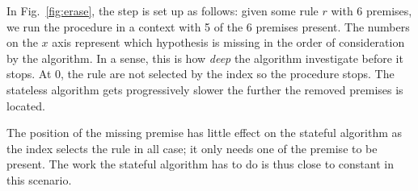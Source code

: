 \documentclass[runningheads]{llncs}
\newcommand{\xcom}[1]{{\color{cyan}{Xavier: #1}} }
\begin{document}
In Fig.~\ref{fig:erase}, the step is set up as follows: given some rule $r$ with $6$ \xcom{motivate 6} premises, we run the procedure in a context with 5 of the 6 premises present.
The numbers on the $x$ axis represent which hypothesis is missing in the order of consideration by the algorithm.
In a sense, this is how \textit{deep} the algorithm investigate before it stops.
At $0$, the rule are not selected by the index so the procedure stops.
The stateless algorithm gets progressively slower the further the removed premises is located.

The position of the missing premise has little effect on the stateful algorithm as the index selects the rule in all case; it only needs one of the premise to be present.
The work the stateful algorithm has to do is thus close to constant in this scenario.



\begin{figure}
\end{figure}
\end{document}
